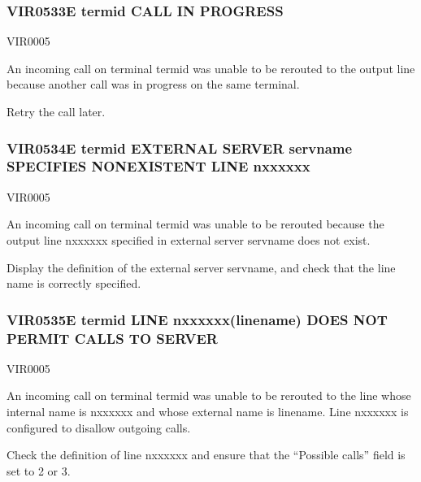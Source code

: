 \documentclass[letterpaper,10pt,english]{sphinxmanual}
\begin{document}
\subsubsection{VIR0533E termid CALL IN PROGRESS}
\label{\detokenize{messages:vir0533e-termid-call-in-progress}}\begin{description}
\sphinxAtStartPar
VIR0005

\sphinxAtStartPar
An incoming call on terminal termid was unable to be rerouted to the output line because another call was in progress on the same terminal.

\sphinxAtStartPar
Retry the call later.

\end{description}


\subsubsection{VIR0534E termid EXTERNAL SERVER servname SPECIFIES NON\sphinxhyphen{}EXISTENT LINE n\sphinxhyphen{}xxxxxx}
\label{\detokenize{messages:vir0534e-termid-external-server-servname-specifies-non-existent-line-n-xxxxxx}}\begin{description}
\sphinxAtStartPar
VIR0005

\sphinxAtStartPar
An incoming call on terminal termid was unable to be rerouted because the output line n\sphinxhyphen{}xxxxxx specified in external server servname does not exist.

\sphinxAtStartPar
Display the definition of the external server servname, and check that the line name is correctly specified.

\end{description}


\subsubsection{VIR0535E termid LINE n\sphinxhyphen{}xxxxxx(linename) DOES NOT PERMIT CALLS TO SERVER}
\label{\detokenize{messages:vir0535e-termid-line-n-xxxxxx-linename-does-not-permit-calls-to-server}}\begin{description}
\sphinxAtStartPar
VIR0005

\sphinxAtStartPar
An incoming call on terminal termid was unable to be rerouted to the line whose internal name is n\sphinxhyphen{}xxxxxx and whose external name is linename. Line n\sphinxhyphen{}xxxxxx is configured to disallow outgoing calls.

\sphinxAtStartPar
Check the definition of line n\sphinxhyphen{}xxxxxx and ensure that the “Possible calls” field is set to 2 or 3.

\end{description}
\end{document}
